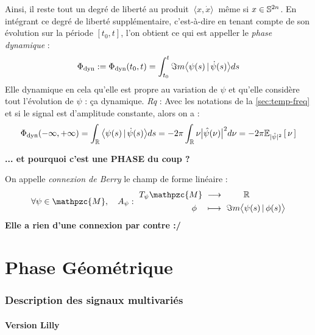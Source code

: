 \begin{definition}\label{def:phase_dyn}
	Ainsi, il reste tout un degré de liberté au produit $\ \langle x, \dot{x} \rangle\ $ même si $x\in\S^{2n}$. En intégrant ce degré de liberté supplémentaire, c'est-à-dire en tenant compte de son évolution sur la période $[t_0,t]$, l'on obtient ce qui est appeller le \emph{phase dynamique} :
	\[\phased \defeq \phased(t_0,t) = \int_{t_0}^t \Im m \big\langle \psi(s) \, |\, \dot{\psi}(s) \big\rangle ds\]
	Elle dynamique en cela qu'elle est propre au variation de $\psi$ et qu'elle considère tout l'évolution de $\psi$ : ça dynamique.
	\textit{Rq} : Avec les notations de la \cref{sec:temp-freq} et si le signal est d'amplitude constante, alors on a :
	 \[\phased(-\infty, +\infty) = \int_\R \big\langle \psi(s) \, |\, \dot{\psi}(s) \big\rangle ds = -2\pi\int_\R \nu\big|\hat{\psi}(\nu)\big|^2 d\nu = - 2\pi \esp[|\hat{\psi}|^2]{\nu}\]
	
	\textbf{... et pourquoi c'est une PHASE du coup ?}
\end{definition}


\begin{definition}\label{def:berry_connx}
	On appelle \emph{connexion de Berry} le champ de forme linéaire :
	\begin{equation}\label{eq:berry_connx}
		\forall \psi\in\mathpzc{M},\quad A_\psi :\ \begin{aligned} T_\psi\mathpzc{M}\ &\lr\qquad\ \R \\ \phi\quad &\longmapsto\ \Im m \big\langle \psi(s) \, |\, \phi(s) \big\rangle
		\end{aligned}
	\end{equation}
	\textbf{Elle a rien d'une connexion par contre :/}
\end{definition}





\setcounter{section}{0}
\setcounter{figure}{0}
\setcounter{lstlisting}{0}

\part{Phase Géométrique}

\section{Description des signaux multivariés}\label{sec:bases}

\subsection{Version Lilly \cite{lilly_bivariate_2010, lilly_analysis_2012}}

